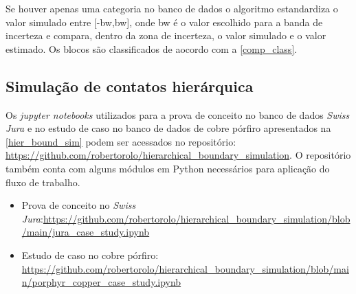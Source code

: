 Se houver apenas uma categoria no banco de dados o algoritmo estandardiza o valor simulado entre [-bw,bw], onde bw é o valor escolhido para a banda de incerteza e compara, dentro da zona de incerteza, o valor simulado e o valor estimado. Os blocos são classificados de aocordo com a \autoref{comp_class}.

\subsection{Simulação de contatos hierárquica}

Os \textit{jupyter notebooks} utilizados para a prova de conceito no banco de dados \textit{Swiss Jura} e no estudo de caso no banco de dados de cobre pórfiro apresentados na \autoref{hier_bound_sim} podem ser acessados no repositório: \url{https://github.com/robertorolo/hierarchical_boundary_simulation}. O repositório também conta com alguns módulos em Python necessários para aplicação do fluxo de trabalho.

\begin{itemize}
    \item Prova de conceito no \textit{Swiss Jura}:\url{https://github.com/robertorolo/hierarchical_boundary_simulation/blob/main/jura_case_study.ipynb}
    \item Estudo de caso no cobre pórfiro: \url{https://github.com/robertorolo/hierarchical_boundary_simulation/blob/main/porphyr_copper_case_study.ipynb}
\end{itemize}


















